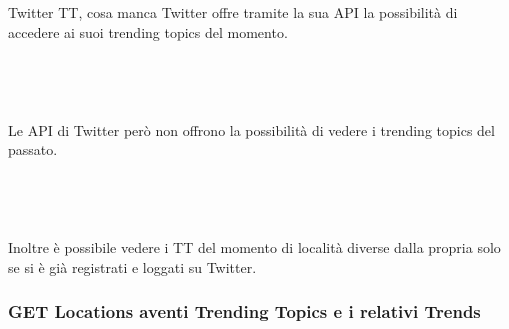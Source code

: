 \documentclass[xcolor=svgnames, aspectratio=169]{beamer}
\begin{document}

\begin{frame}{Twitter TT, cosa manca}
    \fontsize{10pt}{10}\selectfont
    Twitter offre tramite la sua API la possibilità di accedere ai suoi trending topics del momento.\\~\\~\\~\\~\\
    
    Le API di Twitter però non offrono la possibilità di vedere i trending topics del passato.\\~\\~\\~\\~\\
    
    Inoltre è possibile vedere i TT del momento di località diverse dalla propria solo se si è già registrati e loggati su Twitter.
\end{frame}


\subsubsection{GET Locations aventi Trending Topics e i relativi Trends}
\end{document}
